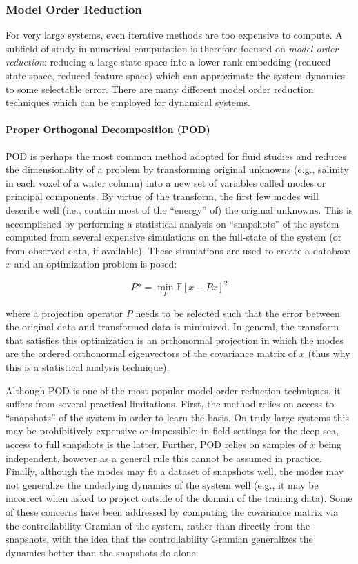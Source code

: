 \subsubsection{Model Order Reduction}
For very large systems, even iterative methods are too expensive to compute. A subfield of study in numerical computation is therefore focused on \emph{model order reduction}: reducing a large state space into a lower rank embedding (reduced state space, reduced feature space) which can approximate the system dynamics to some selectable error. There are many different model order reduction techniques which can be employed for dynamical systems.

\paragraph{Proper Orthogonal Decomposition (POD)} POD is perhaps the most common method adopted for fluid studies and reduces the dimensionality of a problem by transforming original unknowns (e.g., salinity in each voxel of a water column) into a new set of variables called modes or principal components\autocite{lassila2014model}. By virtue of the transform, the first few modes will describe well (i.e., contain most of the ``energy'' of) the original unknowns. This is accomplished by performing a statistical analysis on ``snapshots'' of the system computed from several expensive simulations on the full-state of the system (or from observed data, if available). These simulations are used to create a database $x$  and an optimization problem is posed:

\begin{equation}
	P* = \min_P\mathbb{E}[x - Px]^2
\end{equation}

\noindent where a projection operator $P$ needs to be selected such that the error between the original data and transformed data is minimized. In general, the transform that satisfies this optimization is an orthonormal projection in which the modes are the ordered orthonormal eigenvectors of the covariance matrix of $x$ (thus why this is a statistical analysis technique).

Although POD is one of the most popular model order reduction techniques, it suffers from several practical limitations. First, the method relies on access to ``snapshots'' of the system in order to learn the basis.  On truly large systems this may be prohibitively expensive or impossible; in field settings for the deep sea, access to full snapshots is the latter. Further, POD relies on samples of $x$ being independent, however as a general rule this cannot be assumed in practice. Finally, although the modes may fit a dataset of snapshots well, the modes may not generalize the underlying dynamics of the system well (e.g., it may be incorrect when asked to project outside of the domain of the training data). Some of these concerns have been addressed by computing the covariance matrix via the controllability Gramian of the system, rather than directly from the snapshots, with the idea that the controllability Gramian generalizes the dynamics better than the snapshots do alone\autocite{georges1995use,zhao2019networks}.

